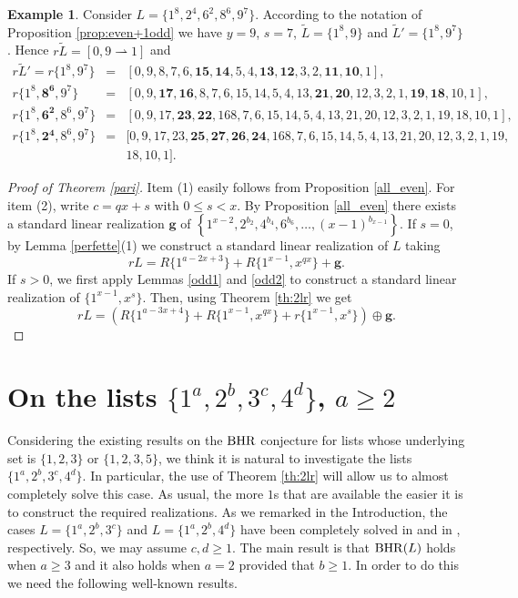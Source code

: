 \documentclass{amsart}
\theoremstyle{definition}
\newtheorem{ex}[prop]{Example}
\numberwithin{equation}{section}
\def\BHR{\mathop{\rm BHR}}
\def\giu{\rightharpoonup}
\def\ol{\oplus}
\begin{document}
\begin{ex}
Consider $L=\{1^8,2^4,6^2,8^6,9^7\}$. According to the notation of Proposition \ref{prop:even+1odd}
we have $y=9$, $s=7$, $\tilde L=\{1^8,9\}$ and $\tilde L'=\{1^8,9^7\}$. Hence $r\tilde L=[0,9\giu 1]$
and
$$\begin{array}{rcl}

r\tilde L'=r\{1^{8}, 9^7\}  & = & [0,9,8,7,6,\bm{15}, \bm{14},5,4, \bm{13}, \bm{12}, 3,2, \bm{11}, \bm{10},1 ],\\
r\{1^{8}, \bm{8^6}, 9^7\}  & = & [0,9,\bm{17}, \bm{16},8,7,6,15,14,5,4,13, \bm{21}, \bm{20}, 12, 3,2, 1, \bm{19}, \bm{18},10, 1 ],\\
r\{1^{8}, \bm{6^2},8^6, 9^7\}  & = & [0,9,17,\bm{23}, \bm{22},16 8,7,6,15,14,5,4,13, 21, 20, 12, 3,2, 1, 19, 18,10, 1 ],\\
r\{1^{8}, \bm{2^4},8^6, 9^7\}  & = & [0,9,17,23, \bm{25}, \bm{27},\bm{26}, \bm{24},16 8,7,6,15,14,5,4,13, 21, 20, 12, 3,2, 1, 19,\\
& & 18,10, 1 ].
\end{array}$$
\end{ex}


\begin{proof}[Proof of Theorem \rm{\ref{pari}}]
Item (1) easily follows from Proposition \ref{all_even}.
For item (2), write $c=qx+s$ with $0\leq s <x$.
By Proposition \ref{all_even} there exists a standard linear realization $\bm{g}$ of 
$\left\{1^{x-2}, 2^{b_2}, 4^{b_4}, 6^{b_6},\ldots, (x-1)^{b_{x-1}} \right\}$.
If $s=0$, by Lemma \ref{perfette}(1) we construct a standard linear realization of $L$ taking
$$rL=R\{1^{a-2x+3}\}+R\{1^{x-1},x^{qx}\}+\bm{g}.$$
If $s>0$, we first apply  Lemmas \ref{odd1} and \ref{odd2} to construct a standard 
linear realization of $\{1^{x-1},x^s\}$.
Then, using Theorem \ref{th:2lr} we get
$$rL=(R\{1^{a-3x+4} \}+R\{1^{x-1},x^{qx} \}+r\{1^{x-1},x^s \})\ol \bm{g}.$$
\end{proof}



\section{On the lists  $\{1^a,2^b,3^c,4^d\}$, $a\geq 2$}\label{new}

Considering the existing results on the $\BHR$ conjecture for lists whose underlying set is $\{1,2,3\}$ or
$\{1,2,3,5\}$, we think it is natural to investigate the lists  $\{1^a, 2^b, 3^c, 4^d \}$.
In particular, the  use of Theorem \ref{th:2lr}
will allow us to almost completely solve this case.
As usual, the more $1$s that are available the easier it is to construct the required realizations.
As we remarked in the Introduction, the cases $L=\{1^a,2^b,3^c\}$ and $L=\{1^a,2^b,4^d\}$ have been completely
solved in \cite{CDF} and in \cite{PPnew}, respectively. So, we may assume $c,d\geq 1$.
The main result is that $\BHR(L)$ holds when $a \geq 3$ and it also holds when $a=2$ provided that $b\geq 1$.
In order to do this we need the following well-known results.
\end{document}
